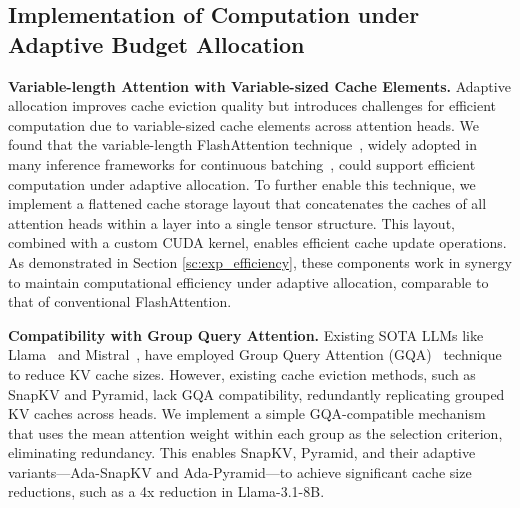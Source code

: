 \subsection{Implementation of Computation under Adaptive Budget Allocation}
\label{sec:imp}
\textbf{Variable-length Attention with Variable-sized Cache Elements.} Adaptive allocation improves cache eviction quality but introduces challenges for efficient computation due to variable-sized cache elements across attention heads. We found that the variable-length FlashAttention technique~\cite{dao2022flashattention,dao2023flashattention}, widely adopted in many inference frameworks for continuous batching~\cite{kwon2023efficient}, could support efficient computation under adaptive allocation. To further enable this technique, we implement a flattened cache storage layout that concatenates the caches of all attention heads within a layer into a single tensor structure. This layout, combined with a custom CUDA kernel, enables efficient cache update operations. As demonstrated in Section \ref{sc:exp_efficiency}, these components work in synergy to maintain computational efficiency under adaptive allocation, comparable to that of conventional FlashAttention.




\textbf{Compatibility with Group Query Attention.}
Existing SOTA LLMs like Llama~\cite{llama3} and Mistral~\cite{jiang2023mistral}, have  employed Group Query Attention (GQA)~\cite{GQA} technique to reduce KV cache sizes.
However, existing cache eviction methods, such as SnapKV and Pyramid, lack GQA compatibility, redundantly replicating grouped KV caches across heads.
We implement a simple GQA-compatible  mechanism that uses the mean attention weight within each group as the selection criterion, eliminating redundancy. This enables SnapKV, Pyramid, and their adaptive variants---Ada-SnapKV and Ada-Pyramid---to achieve significant cache size reductions, such as a 4x reduction in Llama-3.1-8B.


